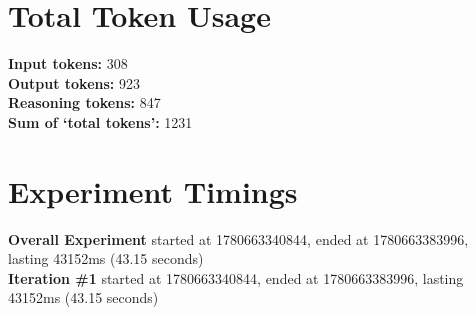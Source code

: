 \documentclass{article}
\begin{document}
\section*{Total Token Usage}
\textbf{Input tokens: }308
\\\textbf{Output tokens: }923
\\\textbf{Reasoning tokens: }847
\\\textbf{Sum of `total tokens': }1231
\section*{Experiment Timings}
\textbf{Overall Experiment} started at 1780663340844, ended at 1780663383996, lasting 43152ms (43.15 seconds)
\\\textbf{Iteration \#1} started at 1780663340844, ended at 1780663383996, lasting 43152ms (43.15 seconds)
\end{document}
